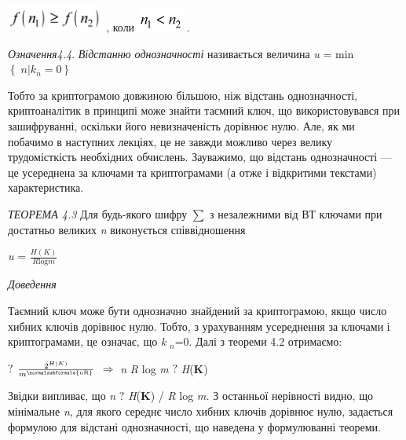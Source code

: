 {\centering
 \includegraphics[width=1.2555in,height=0.3339in]{crypt-img/crypt-img43.png} , 
коли  
\includegraphics[width=0.598in,height=0.2984in]{crypt-img/crypt-img44.png} .
\par}

\textit{Означення4.4}. \textit{Відстанню  однозначності} називається
величина\textit{  } \textit{u}\textit{ }= min 
${\left\{\;n|k_{{n}}\right.=0\left.\right\}}$

Тобто  за криптограмою довжиною більшою, ніж відстань однозначності,
криптоаналітик в принципі може знайти таємний ключ, що використовувався при
зашифруванні, оскільки його невизначеність дорівнює нулю. Але, як ми побачимо в
наступних лекціях, це не завжди можливо через  велику трудомісткість необхідних
обчислень. Зауважимо, що відстань однозначності --- це усереднена за ключами та
криптограмами (а отже і відкритими текстами) характеристика.

\textit{ТЕОРЕМА 4.3 } Для будь-якого шифру   ${\sum {}}$ з незалежними від ВТ 
ключами  при достатньо великих \textit{n} виконується  співвідношення

{\centering
\textit{u}\textit{ }=   ${\frac{H(K)}{R\text{log}m}}$
\par}

{\itshape
Доведення}

 Таємний ключ може бути однозначно знайдений за  криптограмою, якщо число хибних
ключів дорівнює нулю. Тобто, з урахуванням усереднення за ключами і
криптограмами, це означає, що\textit{  }\textit{k} ${{}_{{n}}}$=0. Далі з
теореми 4.2 отримаємо: 

{   ${?}$   ${\frac{2^{{H(K)}}}{m^{{\normalsubformula{\text{nR}}}}}}$  
${\Rightarrow }$\textit{  }\textit{n}\textit{ }\textit{R}\textit{ }log
\textit{m}  ${?}$  \textit{H}(\textbf{K}) 
\par}


\bigskip

Звідки  випливає, що  \textit{n}  ${?}$  \textit{H}(\textbf{K}) / \textit{R} log
\textit{m}\textit{.}\textit{ }З останньої нерівності видно, що мінімальне
\textit{n}, для якого середнє число хибних ключів дорівнює нулю, задається
формулою для відстані однозначності, що наведена у формулюванні теореми.   $ $
$ $ 

